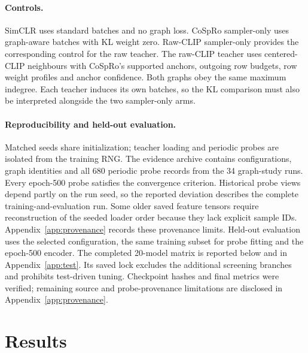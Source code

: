 \documentclass{article}
\begin{document}
\paragraph{Controls.}
SimCLR uses standard batches and no graph loss. CoSpRo sampler-only uses graph-aware
batches with KL weight zero. Raw-CLIP sampler-only provides the corresponding
control for the raw teacher. The raw-CLIP teacher uses centered-CLIP neighbours
with CoSpRo's supported anchors, outgoing row budgets, row weight profiles and
anchor confidence. Both graphs obey the same maximum indegree. Each teacher
induces its own batches, so the KL comparison must also be interpreted alongside
the two sampler-only arms.

\paragraph{Reproducibility and held-out evaluation.}
Matched seeds share initialization; teacher loading and periodic probes are
isolated from the training RNG. The evidence archive contains configurations,
graph identities and all 680 periodic probe records from the 34 graph-study
runs. Every epoch-500 probe satisfies the convergence criterion. Historical
probe views depend partly on the run seed, so the reported deviation describes
the complete training-and-evaluation run. Some older saved feature tensors
require reconstruction of the seeded loader order because they lack explicit
sample IDs. Appendix~\ref{app:provenance} records these provenance limits.
Held-out evaluation uses the selected configuration, the same training subset
for probe fitting and the epoch-500 encoder. The completed 20-model matrix is
reported below and in Appendix~\ref{app:test}. Its saved lock excludes the
additional screening branches and prohibits test-driven tuning. Checkpoint
hashes and final metrics were verified; remaining source and probe-provenance
limitations are disclosed in Appendix~\ref{app:provenance}.

\section{Results}
\end{document}
